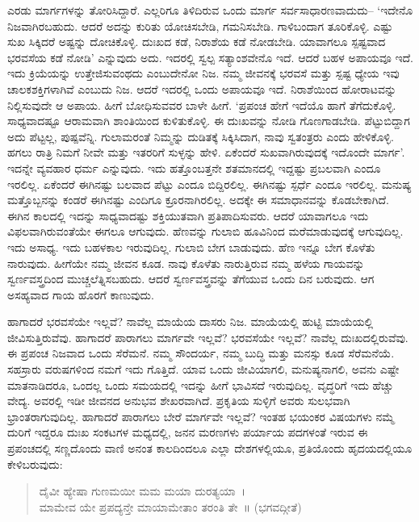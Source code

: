 ಎರಡು ಮಾರ್ಗಗಳನ್ನು ತೋರಿಸಿದ್ದಾರೆ. ಎಲ್ಲರಿಗೂ ತಿಳಿದಿರುವ ಒಂದು ಮಾರ್ಗ ಸರ್ವಸಾಧಾರಣವಾದುದು– ‘ಇದೇನೊ ನಿಜವಾಗಿರಬಹುದು. ಆದರೆ ಅದನ್ನು ಕುರಿತು ಯೋಚಿಸಬೇಡಿ, ಗಮನಿಸಬೇಡಿ. ಗಾಳಿಬಂದಾಗ ತೂರಿಕೊಳ್ಳಿ. ಎಷ್ಟು ಸುಖ ಸಿಕ್ಕಿದರೆ ಅಷ್ಟನ್ನು ದೋಚಿಕೊಳ್ಳಿ. ದುಃಖದ ಕಡೆ, ನಿರಾಶೆಯ ಕಡೆ ನೋಡಬೇಡಿ. ಯಾವಾಗಲೂ ಸ್ಪಷ್ಟವಾದ ಭರವಸೆಯ ಕಡೆ ನೋಡಿ’ ಎನ್ನುವುದು ಅದು. ಇದರಲ್ಲಿ ಸ್ವಲ್ಪ ಸತ್ಯಾಂಶವೇನೊ ಇದೆ. ಆದರೆ ಬಹಳ ಅಪಾಯವೂ ಇದೆ. ಇದು ಕ್ರಿಯೆಯನ್ನು ಉತ್ತೇಜಿಸುವಂಥದು ಎಂಬುದೇನೋ ನಿಜ. ನಮ್ಮ ಜೀವನಕ್ಕೆ ಭರವಸೆ ಮತ್ತು ಸ್ಪಷ್ಟ ಧ್ಯೇಯ ಇವು ಚಾಲಕಶಕ್ತಿಗಳಾಗಿವೆ ಎಂಬುದು ನಿಜ. ಆದರೆ ಇದರಲ್ಲಿ ಒಂದು ಅಪಾಯವೂ ಇದೆ. ನಿರಾಶೆಯಿಂದ ಹೋರಾಟವನ್ನು ನಿಲ್ಲಿಸುವುದೇ ಆ ಅಪಾಯ. ಹೀಗೆ ಬೋಧಿಸುವವರ ಬಾಳೇ ಹೀಗೆ. ‘ಪ್ರಪಂಚ ಹೇಗೆ ಇದೆಯೊ ಹಾಗೆ ತೆಗೆದುಕೊಳ್ಳಿ. ಸಾಧ್ಯವಾದಷ್ಟೂ ಆರಾಮವಾಗಿ ಶಾಂತಿಯಿಂದ ಕುಳಿತುಕೊಳ್ಳಿ. ಈ ದುಃಖವನ್ನು ನೋಡಿ ಗೊಣಗಾಡಬೇಡಿ. ಪೆಟ್ಟುಬಿದ್ದಾಗ ಅದು ಪೆಟ್ಟಲ್ಲ, ಪುಷ್ಪವೆನ್ನಿ. ಗುಲಾಮರಂತೆ ನಿಮ್ಮನ್ನು ದುಡಿತಕ್ಕೆ ಸಿಕ್ಕಿಸಿದಾಗ, ನಾವು ಸ್ವತಂತ್ರರು ಎಂದು ಹೇಳಿಕೊಳ್ಳಿ. ಹಗಲು ರಾತ್ರಿ ನಿಮಗೆ ನೀವೇ ಮತ್ತು ಇತರರಿಗೆ ಸುಳ್ಳನ್ನು ಹೇಳಿ. ಏಕೆಂದರೆ ಸುಖವಾಗಿರುವುದಕ್ಕೆ ಇದೊಂದೇ ಮಾರ್ಗ’. ಇದನ್ನೇ ವ್ಯವಹಾರ ಧರ್ಮ ಎನ್ನುವುದು. ಇದು ಹತ್ತೊಂಬತ್ತನೇ ಶತಮಾನದಲ್ಲಿ ಇದ್ದಷ್ಟು ಪ್ರಬಲವಾಗಿ ಎಂದೂ ಇರಲಿಲ್ಲ. ಏಕೆಂದರೆ ಈಗಿನಷ್ಟು ಬಲವಾದ ಪೆಟ್ಟು ಎಂದೂ ಬಿದ್ದಿರಲಿಲ್ಲ. ಈಗಿನಷ್ಟು ಸ್ಪರ್ಧೆ ಎಂದೂ ಇರಲಿಲ್ಲ. ಮನುಷ್ಯ ಮತ್ತೊಬ್ಬನನ್ನು ಕಂಡರೆ ಈಗಿನಷ್ಟು ಎಂದಿಗೂ ಕ್ರೂರನಾಗಿರಲಿಲ್ಲ. ಅದಕ್ಕೇ ಈ ಸಮಾಧಾನವನ್ನು ಕೊಡಬೇಕಾಗಿದೆ. ಈಗಿನ ಕಾಲದಲ್ಲಿ ಇದನ್ನು ಸಾಧ್ಯವಾದಷ್ಟು ಶಕ್ತಿಯುತವಾಗಿ ಪ್ರತಿಪಾದಿಸುವರು. ಆದರೆ ಯಾವಾಗಲೂ ಇದು ವಿಫಲವಾಗಿರುವಂತೆಯೇ ಈಗಲೂ ಆಗುವುದು. ಹೆಣವನ್ನು ಗುಲಾಬಿ ಹೂವಿನಿಂದ ಮರೆಮಾಡುವುದಕ್ಕೆ ಆಗುವುದಿಲ್ಲ. ಇದು ಅಸಾಧ್ಯ. ಇದು ಬಹಳಕಾಲ ಇರುವುದಿಲ್ಲ. ಗುಲಾಬಿ ಬೇಗ ಬಾಡುವುದು. ಹೆಣ ಇನ್ನೂ ಬೇಗ ಕೊಳೆತು ನಾರುವುದು. ಹೀಗೆಯೇ ನಮ್ಮ ಜೀವನ ಕೂಡ. ನಾವು ಕೊಳೆತು ನಾರುತ್ತಿರುವ ನಮ್ಮ ಹಳೆಯ ಗಾಯವನ್ನು ಸ್ವರ್ಣವಸ್ತ್ರದಿಂದ ಮುಚ್ಚಲೆತ್ನಿಸಬಹುದು. ಆದರೆ ಸ್ವರ್ಣವಸ್ತ್ರವನ್ನು ತೆಗೆಯುವ ಒಂದು ದಿನ ಬರುವುದು. ಆಗ ಅಸಹ್ಯವಾದ ಗಾಯ ಹೊರಗೆ ಕಾಣುವುದು.

ಹಾಗಾದರೆ ಭರವಸೆಯೇ ಇಲ್ಲವೆ? ನಾವೆಲ್ಲ ಮಾಯೆಯ ದಾಸರು ನಿಜ. ಮಾಯೆಯಲ್ಲಿ ಹುಟ್ಟಿ ಮಾಯೆಯಲ್ಲಿ ಜೀವಿಸುತ್ತಿರುವೆವು. ಹಾಗಾದರೆ ಪಾರಾಗಲು ಮಾರ್ಗವೇ ಇಲ್ಲವೆ? ಭರವಸೆಯೇ ಇಲ್ಲವೆ? ನಾವೆಲ್ಲ ದುಃಖದಲ್ಲಿರುವೆವು. ಈ ಪ್ರಪಂಚ ನಿಜವಾದ ಒಂದು ಸೆರೆಮನೆ. ನಮ್ಮ ಸೌಂದರ್ಯ, ನಮ್ಮ ಬುದ್ಧಿ ಮತ್ತು ಮನಸ್ಸು ಕೂಡ ಸೆರೆಮನೆಯೆ. ಸಹಸ್ರಾರು ವರುಷಗಳಿಂದ ನಮಗೆ ಇದು ಗೊತ್ತಿದೆ. ಯಾವ ಒಂದು ಜೀವಿಯಾಗಲಿ, ಮನುಷ್ಯನಾಗಲಿ, ಅವನು ಎಷ್ಟೇ ಮಾತನಾಡಿದರೂ, ಒಂದಲ್ಲ ಒಂದು ಸಮಯದಲ್ಲಿ ಇದನ್ನು ಹೀಗೆ ಭಾವಿಸದೆ ಇರುವುದಿಲ್ಲ. ವೃದ್ಧರಿಗೆ ಇದು ಹೆಚ್ಚು ವೇದ್ಯ. ಅವರಲ್ಲಿ ಇಡೀ ಜೀವನದ ಅನುಭವ ಶೇಖರವಾಗಿದೆ. ಪ್ರಕೃತಿಯ ಸುಳ್ಳಿಗೆ ಅವರು ಸುಲಭವಾಗಿ ಭ್ರಾಂತರಾಗುವುದಿಲ್ಲ. ಹಾಗಾದರೆ ಪಾರಾಗಲು ಬೇರೆ ಮಾರ್ಗವೇ ಇಲ್ಲವೆ? ಇಂತಹ ಭಯಂಕರ ವಿಷಯಗಳು ನಮ್ಮೆ ದುರಿಗೆ ಇದ್ದರೂ ದುಃಖ ಸಂಕಟಗಳ ಮಧ್ಯದಲ್ಲಿ, ಜನನ ಮರಣಗಳು ಪರ್ಯಾಯ ಪದಗಳಂತೆ ಇರುವ ಈ ಪ್ರಪಂಚದಲ್ಲಿ ಸಣ್ಣದೊಂದು ವಾಣಿ ಅನಂತ ಕಾಲದಿಂದಲೂ ಎಲ್ಲಾ ದೇಶಗಳಲ್ಲಿಯೂ, ಪ್ರತಿಯೊಂದು ಹೃದಯದಲ್ಲಿಯೂ ಕೇಳಿಬರುವುದು:

\begin{verse}
ದೈವೀ ಹ್ಯೇಷಾ ಗುಣಮಯೀ ಮಮ ಮಯಾ ದುರತ್ಯಯಾ~।\\ಮಾಮೇವ ಯೇ ಪ್ರಪದ್ಯನ್ತೇ ಮಾಯಾಮೇತಾಂ ತರಂತಿ ತೇ~॥ (ಭಗವದ್ಗೀತೆ)
\end{verse}

